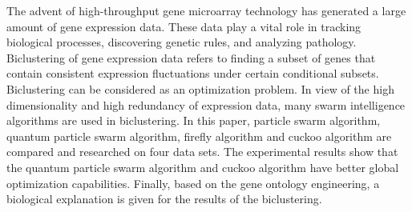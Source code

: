 \begin{eabstract}
  The advent of high-throughput gene microarray technology has generated a large amount of gene expression data. These data play a vital role in tracking biological processes, discovering genetic rules, and analyzing pathology. Biclustering of gene expression data refers to finding a subset of genes that contain consistent expression fluctuations under certain conditional subsets. Biclustering can be considered as an optimization problem. In view of the high dimensionality and high redundancy of expression data, many swarm intelligence algorithms are used in biclustering. In this paper, particle swarm algorithm, quantum particle swarm algorithm, firefly algorithm and cuckoo algorithm are compared and researched on four data sets. The experimental results show that the quantum particle swarm algorithm and cuckoo algorithm have better global optimization capabilities. Finally, based on the gene ontology engineering, a biological explanation is given for the results of the biclustering.

\end{eabstract}